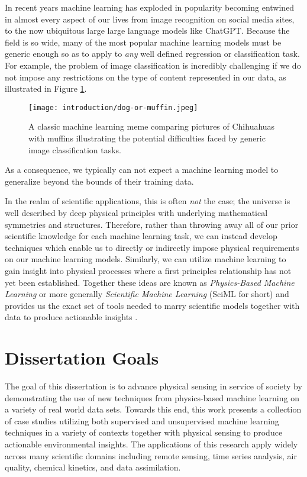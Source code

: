 In recent years machine learning has exploded in popularity becoming entwined in almost every aspect of our lives from image recognition on social media sites, to the now ubiquitous large large language models like ChatGPT. Because the field is so wide, many of the most popular machine learning models must be generic enough so as to apply to \textit{any} well defined regression or classification task. For example, the problem of image classification is incredibly challenging if we do not impose any restrictions on the type of content represented in our data, as illustrated in Figure \ref{fig:dog-or-muffin}.
\begin{figure}[!hbt]
  \centering
  \texttt{[image: introduction/dog-or-muffin.jpeg]}
  \caption{A classic machine learning meme comparing pictures of Chihuahuas with muffins illustrating the potential difficulties faced by generic image classification tasks.}
  \label{fig:dog-or-muffin}
\end{figure}
As a consequence, we typically can not expect a machine learning model to generalize beyond the bounds of their training data.

In the realm of scientific applications, this is often \textit{not} the case; the universe is well described by deep physical principles with underlying mathematical symmetries and structures. Therefore, rather than throwing away all of our prior scientific knowledge for each machine learning task, we can instead develop techniques which enable us to directly or indirectly impose physical requirements on our machine learning models. Similarly, we can utilize machine learning to gain insight into physical processes where a first principles relationship has not yet been established. Together these ideas are known as \textit{Physics-Based Machine Learning} or more generally \textit{Scientific Machine Learning} (SciML for short) and provides us the exact set of tools needed to marry scientific models together with data to produce actionable insights \cite{rackauckas2020universal}.


\section{Dissertation Goals}
The goal of this dissertation is to advance physical sensing in service of society by demonstrating the use of new techniques from physics-based machine learning on a variety of real world data sets. Towards this end, this work presents a collection of case studies utilizing both supervised and unsupervised machine learning techniques in a variety of contexts together with physical sensing to produce actionable environmental insights. The applications of this research apply widely across many scientific domains including remote sensing, time series analysis, air quality, chemical kinetics, and data assimilation.

